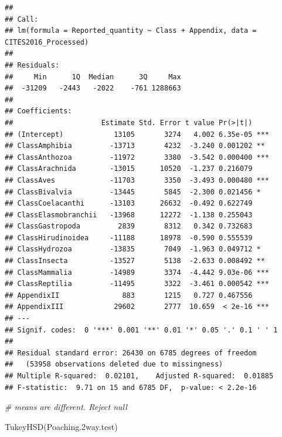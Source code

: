 \documentclass[
  12pt,
]{article}
\newenvironment{Shaded}{\begin{snugshade}}{\end{snugshade}}
\newcommand{\CommentTok}[1]{\textcolor[rgb]{0.56,0.35,0.01}{\textit{#1}}}
\newcommand{\FloatTok}[1]{\textcolor[rgb]{0.00,0.00,0.81}{#1}}
\newcommand{\FunctionTok}[1]{\textcolor[rgb]{0.00,0.00,0.00}{#1}}
\newcommand{\NormalTok}[1]{#1}
\begin{document}
\begin{verbatim}
## 
## Call:
## lm(formula = Reported_quantity ~ Class + Appendix, data = CITES2016_Processed)
## 
## Residuals:
##     Min      1Q  Median      3Q     Max 
##  -31209   -2443   -2022    -761 1288663 
## 
## Coefficients:
##                     Estimate Std. Error t value Pr(>|t|)    
## (Intercept)            13105       3274   4.002 6.35e-05 ***
## ClassAmphibia         -13713       4232  -3.240 0.001202 ** 
## ClassAnthozoa         -11972       3380  -3.542 0.000400 ***
## ClassArachnida        -13015      10520  -1.237 0.216079    
## ClassAves             -11703       3350  -3.493 0.000480 ***
## ClassBivalvia         -13445       5845  -2.300 0.021456 *  
## ClassCoelacanthi      -13103      26632  -0.492 0.622749    
## ClassElasmobranchii   -13968      12272  -1.138 0.255043    
## ClassGastropoda         2839       8312   0.342 0.732683    
## ClassHirudinoidea     -11188      18978  -0.590 0.555539    
## ClassHydrozoa         -13835       7049  -1.963 0.049712 *  
## ClassInsecta          -13527       5138  -2.633 0.008492 ** 
## ClassMammalia         -14989       3374  -4.442 9.03e-06 ***
## ClassReptilia         -11495       3322  -3.461 0.000542 ***
## AppendixII               883       1215   0.727 0.467556    
## AppendixIII            29602       2777  10.659  < 2e-16 ***
## ---
## Signif. codes:  0 '***' 0.001 '**' 0.01 '*' 0.05 '.' 0.1 ' ' 1
## 
## Residual standard error: 26430 on 6785 degrees of freedom
##   (53958 observations deleted due to missingness)
## Multiple R-squared:  0.02101,    Adjusted R-squared:  0.01885 
## F-statistic:  9.71 on 15 and 6785 DF,  p-value: < 2.2e-16
\end{verbatim}

\begin{Shaded}
\begin{Highlighting}[]
\CommentTok{\# means are different. Reject null}

\FunctionTok{TukeyHSD}\NormalTok{(Poaching}\FloatTok{.2}\NormalTok{way.test)}
\end{Highlighting}
\end{Shaded}
\end{document}
